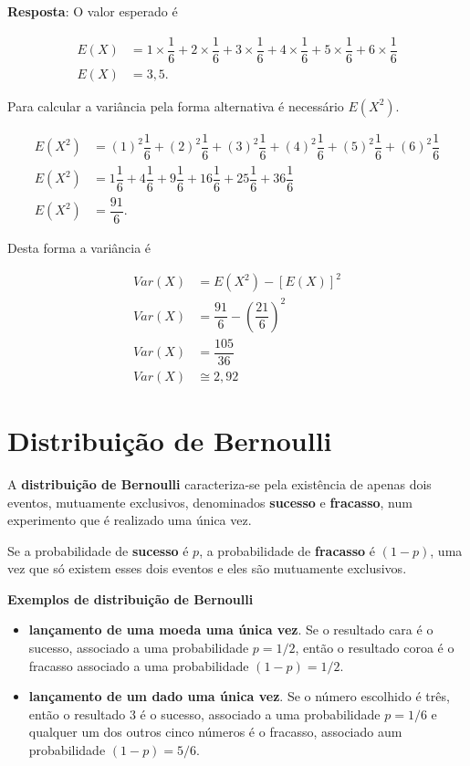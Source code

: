 \documentclass[
]{book}
\begin{document}
\textbf{Resposta}: O valor esperado é

\begin{align}
  E(X) &= 1 \times \dfrac{1}{6} + 2 \times \dfrac{1}{6} + 3\times \dfrac{1}{6} + 4\times \dfrac{1}{6} + 5\times \dfrac{1}{6} + 6\times \dfrac{1}{6}\\
  E(X) &= 3,5.
\end{align}

Para calcular a variância pela forma alternativa é necessário \(E(X^2)\).

\begin{align}
  E(X^2) &= (1)^2\dfrac{1}{6} + (2)^2\dfrac{1}{6} + (3)^2\dfrac{1}{6} + (4)^2\dfrac{1}{6} + (5)^2\dfrac{1}{6} + (6)^2\dfrac{1}{6} \\
  E(X^2) &= 1\dfrac{1}{6} + 4\dfrac{1}{6} + 9\dfrac{1}{6} + 16\dfrac{1}{6} + 25\dfrac{1}{6} + 36\dfrac{1}{6} \\
  E(X^2) &=\dfrac{91}{6}.
\end{align}

Desta forma a variância é

\begin{align}
  Var(X) &= E(X^2) - [E(X)]^2\\
  Var(X) &= \dfrac{91}{6} - \left( \dfrac{21}{6} \right)^2\\
  Var(X) &= \dfrac{105}{36}\\
  Var(X) &\cong 2,92 
\end{align}

\hypertarget{distribuiuxe7uxe3o-de-bernoulli}{%
\section{Distribuição de Bernoulli}\label{distribuiuxe7uxe3o-de-bernoulli}}

A \textbf{distribuição de Bernoulli} caracteriza-se pela existência de apenas dois eventos, mutuamente exclusivos, denominados \textbf{sucesso} e \textbf{fracasso}, num experimento que é realizado uma única vez.

Se a probabilidade de \textbf{sucesso} é \(p\), a probabilidade de \textbf{fracasso} é \((1-p)\), uma vez que só existem esses dois eventos e eles são mutuamente exclusivos.

\textbf{Exemplos de distribuição de Bernoulli}

\begin{itemize}
\item
  \textbf{lançamento de uma moeda uma única vez}. Se o resultado cara é o sucesso, associado a uma probabilidade \(p=1/2\), então o resultado coroa é o fracasso associado a uma probabilidade \((1-p)=1/2\).
\item
  \textbf{lançamento de um dado uma única vez}. Se o número escolhido é três, então o resultado 3 é o sucesso, associado a uma probabilidade \(p=1/6\) e qualquer um dos outros cinco números é o fracasso, associado aum probabilidade \((1-p) = 5/6\).
\end{itemize}
\end{document}
